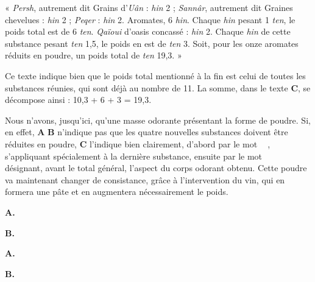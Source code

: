 \documentclass[a4paper, 11pt, oneside, landscape]{article}
\newcommand*\hieroAAAL{}
\newcommand*\hieroAAAM{}
\newcommand*\hieroAABB{}
\newcommand*\hieroAABE{}
\newcommand*\hieroAACY{}
\newcommand*\hieroAADL{}
\newcommand*\hieroAADS{}
\newcommand*\hieroAAEM{}
\newcommand*\hieroAAFI{}
\newcommand*\hieroAAFT{}
\newcommand*\hieroAAGA{}
\newcommand*\hieroAAGN{}
\newcommand*\hieroAAGP{}
\newcommand*\hieroAAHW{}
\newcommand*\hieroAAII{}
\newcommand*\hieroAAIT{}
\newcommand*\hieroAAIW{}
\newcommand*\hieroAAJA{}
\newcommand*\hieroAAJB{}
\newcommand*\hieroAALI{}
\newcommand*\hieroAALK{}
\newcommand*\hieroAALL{}
\newcommand*\hieroAALM{}
\newcommand*\hieroAALN{}
\newcommand*\hieroAALO{}
\newcommand*\hieroAALP{}
\newcommand*\hieroAALQ{}
\newcommand*\hieroAALR{}
\newcommand*\hieroAALS{\raisebox{0.6ex}{}}
\newcommand*\hieroAALT{}
\newcommand*\hieroAALU{}
\newcommand*\hieroAALV{}
\newcommand*\hieroAALW{}
\newcommand*\hieroAALX{}
\newcommand*\hieroAALY{}
\newcommand*\hieroAALZ{}
\newcommand*\hieroAAMA{}
\newcommand*\hieroAAMB{}
\newcommand*\hieroAAMC{}
\newcommand*\hieroAAMD{}
\newcommand*\hieroAAME{}
\newcommand*\hieroAAMF{}
\newcommand*\hieroAAMG{}
\newcommand*\hieroAAMH{}
\newcommand*\hieroAAMI{}
\newcommand*\hieroAAMJ{}
\newcommand*\hieroAAMK{}
\newcommand*\hieroAAML{}
\begin{document}
« \emph{Persh}, autrement dit Grains d'\emph{Uân} : \emph{hin} 2 ; \emph{Sannâr}, autrement dit Graines chevelues : \emph{hin} 2 ; \emph{Peqer} : \emph{hin} 2. Aromates, 6 \emph{hin}. Chaque \emph{hin} pesant 1 \emph{ten}, le poids total est de 6 \emph{ten}. \emph{Qaïoui} d'oasis concassé : \emph{hin} 2. Chaque \emph{hin} de cette substance pesant \emph{ten} 1,5, le poids en est de \emph{ten} 3. Soit, pour les onze aromates réduits en poudre, un poids total de \emph{ten} 19,3. »

Ce texte indique bien que le poids total mentionné à la fin est celui de toutes les substances réunies, qui sont déjà au nombre de 11. La somme, dans le texte \textbf{C}, se décompose ainsi : 10,3 + 6 + 3 = 19,3.

Nous n'avons, jusqu'ici, qu'une masse odorante présentant la forme de poudre. Si, en effet, \textbf{A} \textbf{B} n'indique pas que les quatre nouvelles substances doivent être réduites en poudre, \textbf{C} l'indique bien clairement, d'abord par le mot $\hieroAADS\:\hieroAALK\:\hieroAADS\:\hieroAALK\:\hieroAALL$, s'appliquant spécialement à la dernière substance, ensuite par le mot $\hieroAAGP\:\hieroAACY\:\hieroAAAM\:\hieroAAAM\:\hieroAAHW$ désignant, avant le total général, l'aspect du corps odorant obtenu. Cette poudre va maintenant changer de consistance, grâce à l'intervention du vin, qui en formera une pâte et en augmentera nécessairement le poids.

\hspace*{10mm}\textbf{A.}\hspace*{5mm} $\hieroAALM\:\hieroAALN\:\hieroAALO\:\hieroAAIT\:\hieroAALP$ \hspace*{16mm} $\hieroAAFI\:\hieroAALQ\:\hieroAALR\:\hieroAALS\:\hieroAAAM\:\hieroAAAL$

\hspace*{10mm}\textbf{B.}\hspace*{5mm} $\hieroAALT\:\hieroAAAM\:\hieroAAAM\:\hieroAALU\:\hieroAAAM\:\hieroAALV\:\hieroAALO\:\hieroAAGN\:\hieroAAFT\:\hieroAALP$ \hspace*{2mm} $\hieroAAFI\:\hieroAADL\:\hieroAALW\:\hieroAAAM\:\hieroAALX\:\hieroAAAM\:\hieroAAAL\:\hieroAALY$

\hspace*{10mm}\textbf{A.}\hspace*{5mm} $\hieroAABB\:\hieroAALZ\:\hieroAABE\:\hieroAAMA\:\hieroAAMB\:\hieroAAMC\:\hieroAAMD\:\hieroAAME\:\hieroAAAM\:\hieroAAII\:\hieroAAMF\:\hieroAALI\:\hieroAAGA\:\hieroAAMG$

\hspace*{10mm}\textbf{B.}\hspace*{5mm} $\hieroAAMH\:\hieroAAEM\:\hieroAADS\:\hieroAAAM\:\hieroAAAM\:\hieroAAMI\:\hieroAAAM\:\hieroAAMJ\:\hieroAAMC\:\hieroAAMK\:\hieroAAIW\:\hieroAAAM\:\hieroAALV\:\hieroAALI\:\hieroAAJA\:\hieroAAJB\:\hieroAAML$
\end{document}
